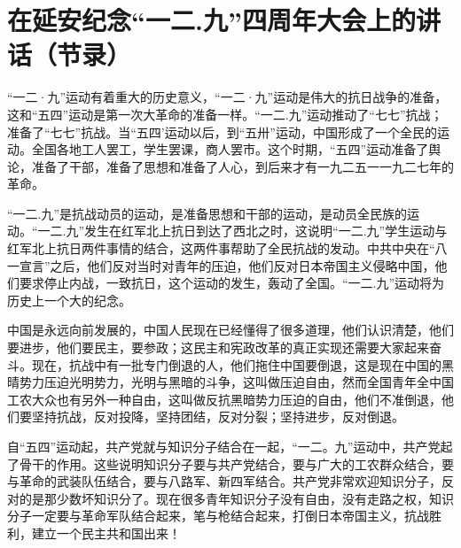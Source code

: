 \section[在延安纪念“一二.九”四周年大会上的讲话（节录）（一九三九年一二月九日）]{在延安纪念“一二.九”四周年大会上的讲话（节录）}


“一二·九”运动有着重大的历史意义，“一二·九”运动是伟大的抗日战争的准备，这和“五四”运动是第一次大革命的准备一样。“一二.九”运动推动了“七七”抗战；准备了“七七”抗战。当“五四’运动以后，到“五卅”运动，中国形成了一个全民的运动。全国各地工人罢工，学生罢课，商人罢市。这个时期，“五四”运动准备了舆论，准备了干部，准备了思想和准备了人心，到后来才有一九二五一一九二七年的革命。

“一二.九”是抗战动员的运动，是准备思想和干部的运动，是动员全民族的运动。“一二.九”发生在红军北上抗日到达了西北之时，这说明“一二.九”学生运动与红军北上抗日两件事情的结合，这两件事帮助了全民抗战的发动。中共中央在“八一宣言”之后，他们反对当时对青年的压迫，他们反对日本帝国主义侵略中国，他们要求停止内战，一致抗日，这个运动的发生，轰动了全国。“一二.九”运动将为历史上一个大的纪念。

中国是永远向前发展的，中国人民现在已经懂得了很多道理，他们认识清楚，他们要进步，他们要民主，要参政；这民主和宪政改革的真正实现还需要大家起来奋斗。现在，抗战中有一批专门倒退的人，他们拖住中国要倒退，这是现在中国的黑晴势力压迫光明势力，光明与黑暗的斗争，这叫做压迫自由，然而全国青年全中国工农大众也有另外一种自由，这叫做反抗黑暗势力压迫的自由，他们不准倒退，他们要坚持抗战，反对投降，坚持团结，反对分裂；坚持进步，反对倒退。

自“五四”运动起，共产党就与知识分子结合在一起，“一二。九”运动中，共产党起了骨干的作用。这些说明知识分子要与共产党结合，要与广大的工农群众结合，要与革命的武装队伍结合，要与八路军、新四军结合。共产党非常欢迎知识分子，反对的是那少数坏知识分了。现在很多青年知识分子没有自由，没有走路之权，知识分子一定要与革命军队结合起来，笔与枪结合起来，打倒日本帝国主义，抗战胜利，建立一个民主共和国出来！

